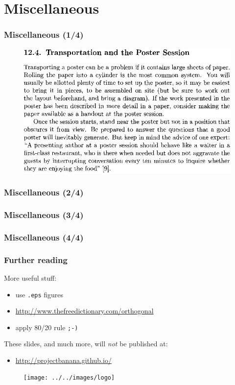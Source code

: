 \documentclass{beamer}
\begin{document}
\section{Miscellaneous}
\begin{frame}
\frametitle{Miscellaneous (1/4)}
\begin{figure}[t]
 \includegraphics[width=\textwidth]{images/poster.jpeg}
\end{figure}
\end{frame}
\begin{frame}
\frametitle{Miscellaneous (2/4)}
\end{frame}\begin{frame}
\frametitle{Miscellaneous (3/4)}
\end{frame}
\begin{frame}
\frametitle{Miscellaneous (4/4)}
\end{frame}

\begin{frame}
\frametitle{Further reading}
More useful stuff:
\vspace{-0.4cm}
\begin{itemize}
 \item use \texttt{.eps} figures
 \item \url{http://www.thefreedictionary.com/orthogonal}
 \item apply 80/20 rule \texttt{;-)}
\end{itemize}

These slides, and much more, will \textit{not} be published at:
\vspace{-0.4cm}
\begin{itemize}
 \item \url{http://projectbanana.github.io/}
\end{itemize}
 \begin{figure}
\centering
 \texttt{[image: ../../images/logo]}
\end{figure}
\end{frame}
\end{document}
